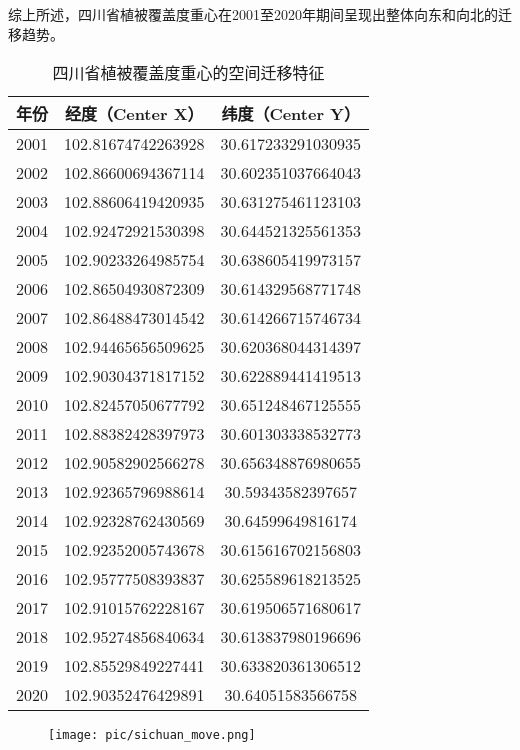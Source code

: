 \documentclass{article}
\begin{document}
		综上所述，四川省植被覆盖度重心在2001至2020年期间呈现出整体向东和向北的迁移趋势。
		\begin{table}[H]
			\centering
			\begin{tabular}{|c|c|c|}
				\hline
				\textbf{年份} & \textbf{经度（Center X）} & \textbf{纬度（Center Y）} \\
				\hline
				2001 & 102.81674742263928 & 30.617233291030935 \\
				2002 & 102.86600694367114 & 30.602351037664043 \\
				2003 & 102.88606419420935 & 30.631275461123103 \\
				2004 & 102.92472921530398 & 30.644521325561353 \\
				2005 & 102.90233264985754 & 30.638605419973157 \\
				2006 & 102.86504930872309 & 30.614329568771748 \\
				2007 & 102.86488473014542 & 30.614266715746734 \\
				2008 & 102.94465656509625 & 30.620368044314397 \\
				2009 & 102.90304371817152 & 30.622889441419513 \\
				2010 & 102.82457050677792 & 30.651248467125555 \\
				2011 & 102.88382428397973 & 30.601303338532773 \\
				2012 & 102.90582902566278 & 30.656348876980655 \\
				2013 & 102.92365796988614 & 30.59343582397657 \\
				2014 & 102.92328762430569 & 30.64599649816174 \\
				2015 & 102.92352005743678 & 30.615616702156803 \\
				2016 & 102.95777508393837 & 30.625589618213525 \\
				2017 & 102.91015762228167 & 30.619506571680617 \\
				2018 & 102.95274856840634 & 30.613837980196696 \\
				2019 & 102.85529849227441 & 30.633820361306512 \\
				2020 & 102.90352476429891 & 30.64051583566758 \\
				\hline
			\end{tabular}
			\caption{四川省植被覆盖度重心的空间迁移特征}
		\end{table}
		
								\begin{figure}[H]  %
	\centering
	\texttt{[image: pic/sichuan\_move.png]} %
\end{figure}
\end{document}
